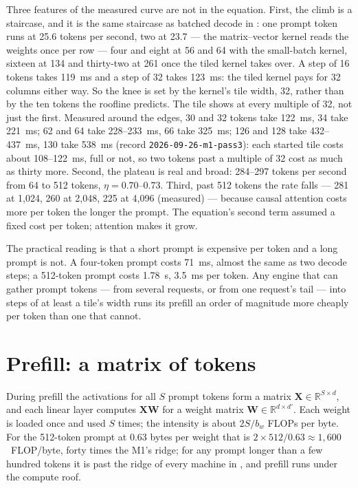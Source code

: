 Three features of the measured curve are not in the equation. First, the climb
is a staircase, and it is the same staircase as batched decode in
: one prompt token runs at 25.6 tokens per second, two at
23.7 --- the matrix--vector kernel reads the weights once per row --- four and
eight at 56 and 64 with the small-batch kernel, sixteen at 134 and thirty-two
at 261 once the tiled kernel takes over. A step of 16 tokens takes 119~ms and a
step of 32 takes 123~ms: the tiled kernel pays for 32 columns either way. So
the knee is set by the kernel's tile width, 32, rather than by the ten tokens
the roofline predicts. The tile shows at every multiple of 32, not just the
first. Measured around the edges, 30 and 32 tokens take 122~ms, 34 take 221~ms;
62 and 64 take 228--233~ms, 66 take 325~ms; 126 and 128 take 432--437~ms, 130
take 538~ms (record \texttt{2026-09-26-m1-pass3}): each started tile costs
about 108--122~ms, full or not, so two tokens past a multiple of 32 cost as
much as thirty more. Second, the plateau is real and broad: 284--297 tokens
per second from 64 to 512 tokens, $\eta = 0.70$--$0.73$. Third, past 512 tokens
the rate falls --- 281 at 1,024, 260 at 2,048, 225 at 4,096 (measured) ---
because causal attention costs more per token the longer the prompt. The
equation's second term assumed a fixed cost per token; attention makes it
grow.

The practical reading is that a short prompt is expensive per token and a
long prompt is not. A four-token prompt costs 71~ms, almost the same as two
decode steps; a 512-token prompt costs 1.78~s, 3.5~ms per token. Any engine
that can gather prompt tokens --- from several requests, or from one request's
tail --- into steps of at least a tile's width runs its prefill an order of
magnitude more cheaply per token than one that cannot.

\section{Prefill: a matrix of tokens}

During prefill the activations for all $S$ prompt tokens form a matrix
$\mathbf{X}\in\mathbb{R}^{S\times d}$, and each linear layer computes
$\mathbf{X}\mathbf{W}$ for a weight matrix
$\mathbf{W}\in\mathbb{R}^{d\times d'}$. Each weight is loaded once and used $S$
times; the intensity is about $2S/b_w$ FLOPs per byte. For the 512-token prompt
at 0.63 bytes per weight that is $2 \times 512 / 0.63 \approx 1{,}600$~FLOP/byte,
forty times the M1's ridge; for any prompt longer than a few hundred tokens it
is past the ridge of every machine in , and prefill runs under
the compute roof.

